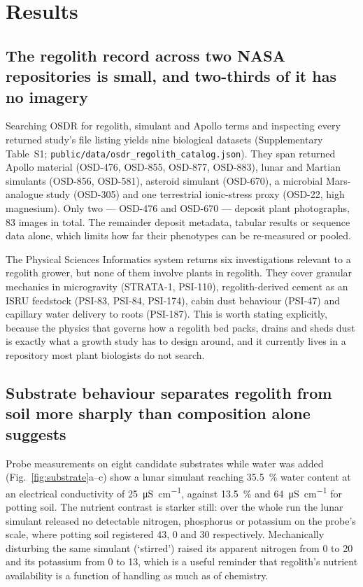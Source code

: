\documentclass[11pt,a4paper]{article}
\begin{document}
\section{Results}

\subsection{The regolith record across two NASA repositories is small, and two-thirds
of it has no imagery}

Searching OSDR for regolith, simulant and Apollo terms and inspecting every returned
study's file listing yields nine biological datasets
(Supplementary Table~S1; \texttt{public/data/osdr\_regolith\_catalog.json}). They span
returned Apollo material (OSD-476, OSD-855, OSD-877, OSD-883), lunar and Martian
simulants (OSD-856, OSD-581), asteroid simulant (OSD-670), a microbial Mars-analogue
study (OSD-305) and one terrestrial ionic-stress proxy (OSD-22, high magnesium). Only
two --- OSD-476 and OSD-670 --- deposit plant photographs, 83 images in total. The
remainder deposit metadata, tabular results or sequence data alone, which limits how far
their phenotypes can be re-measured or pooled.

The Physical Sciences Informatics system returns six investigations relevant to a
regolith grower, but none of them involve plants in regolith. They cover granular
mechanics in microgravity (STRATA-1, PSI-110), regolith-derived cement as an ISRU
feedstock (PSI-83, PSI-84, PSI-174), cabin dust behaviour (PSI-47) and capillary water
delivery to roots (PSI-187). This is worth stating explicitly, because the physics that
governs how a regolith bed packs, drains and sheds dust is exactly what a growth study
has to design around, and it currently lives in a repository most plant biologists do
not search.

\subsection{Substrate behaviour separates regolith from soil more sharply than
composition alone suggests}

Probe measurements on eight candidate substrates while water was added
(Fig.~\ref{fig:substrate}a--c) show a lunar simulant reaching \SI{35.5}{\percent}
water content at an electrical conductivity of \SI{25}{\micro\siemens\per\centi\metre},
against \SI{13.5}{\percent} and \SI{64}{\micro\siemens\per\centi\metre} for potting
soil. The nutrient contrast is starker still: over the whole run the lunar simulant
released no detectable nitrogen, phosphorus or potassium on the probe's scale, where
potting soil registered 43, 0 and 30 respectively. Mechanically disturbing the same
simulant (`stirred') raised its apparent nitrogen from 0 to 20 and its potassium from
0 to 13, which is a useful reminder that regolith's nutrient availability is a function
of handling as much as of chemistry.
\end{document}
